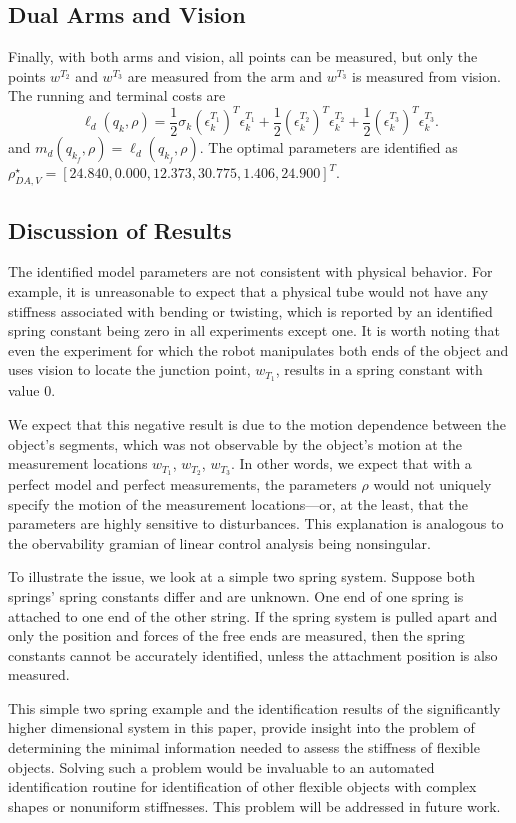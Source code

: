 \documentclass[runningheads,a4paper]{llncs}
\begin{document}
\subsection{Dual Arms and Vision \label{sec-2_vis}}
Finally, with both arms and vision, all points can be measured, but only the points $w^{T_2}$ and $w^{T_3}$ are measured from the arm and $w^{T_3}$ is measured from vision. The running and terminal costs are
\[
\ell_d(q_k,\rho) = \frac{1}{2} \sigma_k(\epsilon^{T_1}_k)^T\epsilon^{T_1}_k + \frac{1}{2} (\epsilon^{T_2}_k)^T\epsilon^{T_2}_k +\frac{1}{2} (\epsilon^{T_3}_k)^T\epsilon^{T_3}_k.
\]
and $m_d(q_{k_f},\rho) = \ell_d(q_{k_f},\rho)$. The optimal parameters are identified as $\rho^\star_{DA,V} = [24.840,  0.000, 12.373, 30.775,  1.406,  24.900]^T$.

\subsection{Discussion of Results}
The identified model parameters are not consistent with physical behavior. For example, it is unreasonable to expect that a physical tube would not have any stiffness associated with bending or twisting, which is reported by an identified spring constant being zero in all experiments except one. It is worth noting that even the experiment for which the robot manipulates both ends of the object and uses vision to locate the junction point, $w_{T_1}$, results in a spring constant with value 0. 

We expect that this negative result is due to the motion dependence between the object's segments, which was not observable by the object's motion at the measurement locations $w_{T_1}$, $w_{T_2}$, $w_{T_3}$.  In other words, we expect that with a perfect model and perfect measurements, the parameters $\rho$ would not uniquely specify the motion of the measurement locations---or, at the least, that the parameters are highly sensitive to disturbances. This explanation is analogous to the obervability gramian of linear control analysis being nonsingular.  

To illustrate the issue, we look at a simple two spring system. Suppose both springs' spring constants differ and are unknown. One end of one spring is attached to one end of the other string. If the spring system is pulled apart and only the position and forces of the free ends are measured, then the spring constants cannot be accurately identified, unless the attachment position is also measured.

This simple two spring example and the identification results of the significantly higher dimensional system in this paper, provide insight into the problem of determining the minimal information needed to assess the stiffness of flexible objects.  Solving such a problem would be invaluable to an automated identification routine for identification of other flexible objects with complex shapes or nonuniform stiffnesses. This problem will be addressed in future work.
\end{document}
